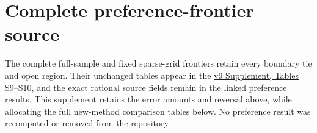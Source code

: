 \section{Complete preference-frontier source}\label{sup:frontier-0}\label{sup:frontier-8}
The complete full-sample and fixed sparse-grid frontiers retain every boundary tie and open region. Their unchanged tables appear in the \href{https://github.com/ByronLi0207/financial-mathematics-paper-20261020/blob/0d2526cc69092c5158437a0509613bac5e86d47f/submission-jof/supplement.pdf}{v9 Supplement, Tables S9--S10}, and the exact rational source fields remain in the linked preference results. This supplement retains the error amounts and reversal above, while allocating the full new-method comparison tables below. No preference result was recomputed or removed from the repository.

